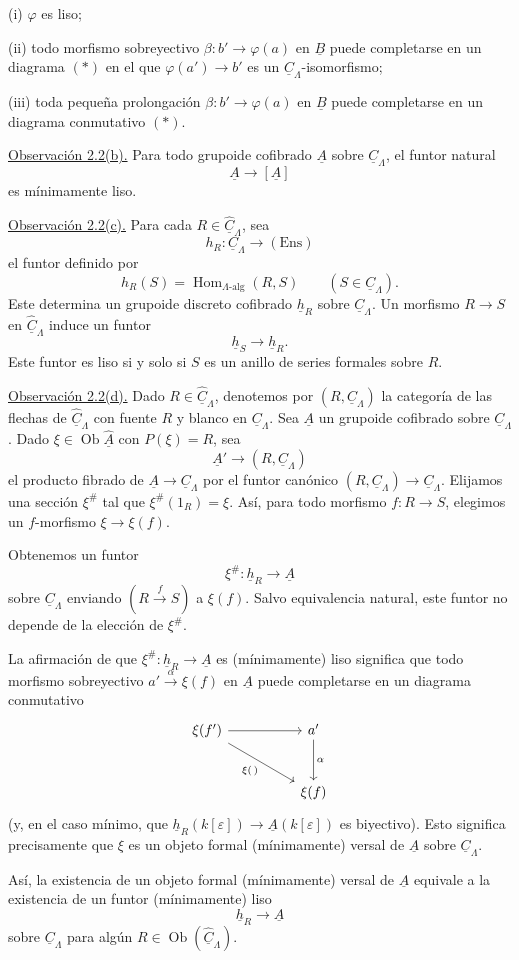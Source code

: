 (i) $\varphi$ es liso;

(ii) todo morfismo sobreyectivo
$\beta:b'\longrightarrow\varphi(a)$ en $\underline B$ puede
completarse en un diagrama $(*)$ en el que
$\varphi(a')\longrightarrow b'$ es un
$\underline C_\Lambda$-isomorfismo;

(iii) toda pequeña prolongación
$\beta:b'\longrightarrow\varphi(a)$ en $\underline B$ puede
completarse en un diagrama conmutativo $(*)$.

\underline{Observación 2.2(b).} Para todo grupoide cofibrado
$\underline A$ sobre $\underline C_\Lambda$, el funtor natural
\[
 \underline A\longrightarrow[\underline A]
\]
es mínimamente liso.

\underline{Observación 2.2(c).} Para cada
$R\in\widehat{\underline C}_\Lambda$, sea
\[
 h_R:\underline C_\Lambda\longrightarrow(\mathrm{Ens})
\]
el funtor definido por
\[
 h_R(S)=\operatorname{Hom}_{\Lambda\text{-alg}}(R,S)
 \qquad(S\in\underline C_\Lambda).
\]
Este determina un grupoide discreto cofibrado $\underline h_R$ sobre
$\underline C_\Lambda$. Un morfismo $R\longrightarrow S$ en
$\widehat{\underline C}_\Lambda$ induce un funtor
\[
 \underline h_S\longrightarrow\underline h_R.
\]
Este funtor es liso si y solo si $S$ es un anillo de series formales
sobre $R$.


\underline{Observación 2.2(d).} Dado
$R\in\widehat{\underline C}_\Lambda$, denotemos por
$(R,\underline C_\Lambda)$ la categoría de las flechas de
$\widehat{\underline C}_\Lambda$ con fuente $R$ y blanco en
$\underline C_\Lambda$. Sea $\underline A$ un grupoide cofibrado
sobre $\underline C_\Lambda$. Dado
$\xi\in\operatorname{Ob}\widehat{\underline A}$ con $P(\xi)=R$,
sea
\[
 \underline A'\longrightarrow(R,\underline C_\Lambda)
\]
el producto fibrado de
$\underline A\longrightarrow\underline C_\Lambda$ por el funtor
canónico
$(R,\underline C_\Lambda)\longrightarrow\underline C_\Lambda$.
Elijamos una sección $\xi^\#$ tal que
$\xi^\#(1_R)=\xi$. Así, para todo morfismo
$f:R\longrightarrow S$, elegimos un $f$-morfismo
$\xi\longrightarrow\xi(f)$.

Obtenemos un funtor
\[
 \xi^\#:\underline h_R\longrightarrow\underline A
\]
sobre $\underline C_\Lambda$ enviando
$(R\xrightarrow{f}S)$ a $\xi(f)$. Salvo equivalencia natural, este
funtor no depende de la elección de $\xi^\#$.

La afirmación de que
$\xi^\#:\underline h_R\longrightarrow\underline A$ es
(mínimamente) liso significa que todo morfismo sobreyectivo
$a'\xrightarrow{\alpha}\xi(f)$ en $\underline A$ puede completarse
en un diagrama conmutativo
\[
\begin{tikzcd}[row sep=large,column sep=huge]
 \xi(f') \arrow[r] \arrow[dr,"{\xi(\,)}"']
 & a' \arrow[d,"\alpha"]\\
 & \xi(f)
\end{tikzcd}
\]
(y, en el caso mínimo, que
$\underline h_R(k[\varepsilon])\longrightarrow
\underline A(k[\varepsilon])$ es biyectivo). Esto significa
precisamente que $\xi$ es un objeto formal (mínimamente) versal de
$\underline A$ sobre $\underline C_\Lambda$.

Así, la existencia de un objeto formal (mínimamente) versal de
$\underline A$ equivale a la existencia de un funtor (mínimamente)
liso
\[
 \underline h_R\longrightarrow\underline A
\]
sobre $\underline C_\Lambda$ para algún
$R\in\operatorname{Ob}(\widehat{\underline C}_\Lambda)$.

